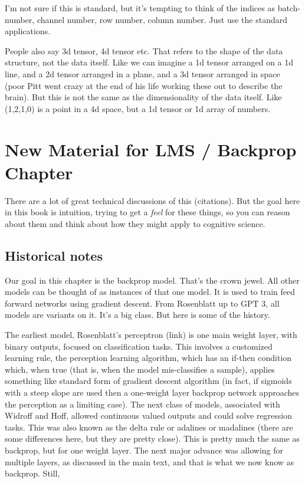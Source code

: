  I'm not sure if this is standard, but it's tempting to think of the indices as batch-number, channel number, row number, column number. Just use the standard applications.

People also say 3d tensor, 4d tensor etc.  That refers to the shape of the data structure, not the data itself.  Like we can imagine a 1d tensor arranged on a 1d line, and a 2d tensor arranged in a plane, and a 3d tensor arranged in space (poor Pitt went crazy at the end of his life working these out to describe the brain).  But this is not the same as the dimensionality of the data itself. Like (1,2,1,0) is a point in a 4d space, but a 1d tensor or 1d array of numbers.

\section{New Material for LMS / Backprop Chapter}

There are a lot of great technical discussions of this (citations). But the goal here in this book is intuition, trying to get a \emph{feel} for these things, so you can reason about them and think about how they might apply to cognitive science. 

\subsection{Historical notes}

Our goal in this chapter is the backprop model. That's the crown jewel. All other models can be thought of as instances of that one model. It is used to train feed forward networks using gradient descent. From Rosenblatt up to GPT 3, all models are variants on it. It's a big class. But here is some of the history.

The earliest model, Rosenblatt's perceptron (link) is one main weight layer, with binary outputs, focused on classification tasks. This involves a customized learning rule, the perception learning algorithm, which has an if-then condition which, when true (that is, when the model mis-classifies a sample), applies something like standard form of gradient descent algorithm (in fact, if sigmoids with a steep slope are used then a one-weight layer backprop network  approaches the perception as a limiting case). The next class of models, associated with Widroff and Hoff, allowed continuous valued outputs and could solve regression tasks. This was also known as the delta rule or adalines or madalines (there are some differences here, but they are pretty close). This is pretty much the same as backprop, but for one weight layer. The next major advance was allowing for multiple layers, as discussed in the main text, and that is what we now know as backprop. Still, 

